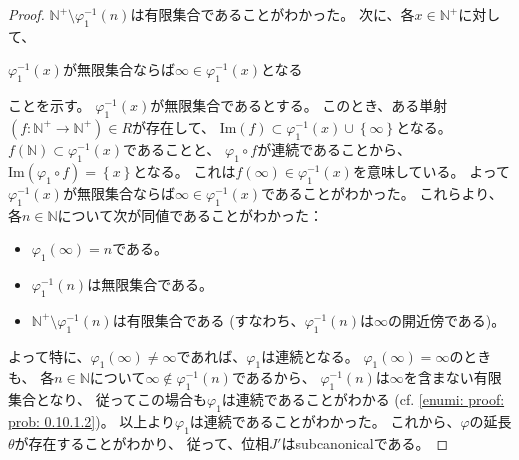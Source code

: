 \documentclass[uplatex]{jsarticle}
\theoremstyle{definition}
\newcommand{\im}{\mathrm{Im}}
\def\N{\mathbb{N}}
\begin{document}
\begin{proof}
  \(\N^+\setminus \varphi_1^{-1}(n)\)は有限集合であることがわかった。
  次に、各\(x\in \N^+\)に対して、
  \begin{center}
    \(\varphi_1^{-1}(x)\)が無限集合ならば\(\infty\in\varphi_1^{-1}(x)\)となる
  \end{center}
  ことを示す。
  \(\varphi_1^{-1}(x)\)が無限集合であるとする。
  このとき、ある単射\((f:\N^+\to \N^+)\in R\)が存在して、
  \(\im(f) \subset \varphi_1^{-1}(x) \cup\left\{\infty\right\}\)となる。
  \(f(\N) \subset \varphi_1^{-1}(x)\)であることと、
  \(\varphi_1\circ f\)が連続であることから、
  \(\im(\varphi_1\circ f) = \left\{ x\right\}\)となる。
  これは\(f(\infty)\in \varphi_1^{-1}(x)\)を意味している。
  よって\(\varphi_1^{-1}(x)\)が無限集合ならば\(\infty\in\varphi_1^{-1}(x)\)であることがわかった。
  これらより、各\(n\in \N\)について次が同値であることがわかった：
  \begin{itemize}
    \item \(\varphi_1(\infty) = n\)である。
    \item \(\varphi_1^{-1}(n)\)は無限集合である。
    \item \(\N^+\setminus \varphi_1^{-1}(n)\)は有限集合である
    (すなわち、\(\varphi_1^{-1}(n)\)は\(\infty\)の開近傍である)。
  \end{itemize}
  よって特に、\(\varphi_1(\infty)\neq \infty\)であれば、\(\varphi_1\)は連続となる。
  \(\varphi_1(\infty) = \infty\)のときも、
  各\(n\in \N\)について\(\infty\not\in\varphi_1^{-1}(n)\)であるから、
  \(\varphi_1^{-1}(n)\)は\(\infty\)を含まない有限集合となり、
  従ってこの場合も\(\varphi_1\)は連続であることがわかる
  (cf. \ref{enumi: proof: prob: 0.10.1.2})。
  以上より\(\varphi_1\)は連続であることがわかった。
  これから、\(\varphi\)の延長\(\theta\)が存在することがわかり、
  従って、位相\(J'\)はsubcanonicalである。


\end{proof}
\end{document}
